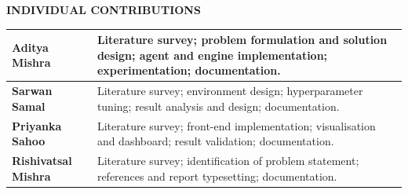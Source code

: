 \begin{center}{\Large\bfseries INDIVIDUAL CONTRIBUTIONS}\end{center}
\vspace{1em}

\begin{table}[H]
\centering
\renewcommand{\arraystretch}{1.4}
\begin{tabular}{|p{4cm}|p{9cm}|}
\hline
\textbf{Aditya Mishra} & Literature survey; problem formulation and solution design; agent and engine implementation; experimentation; documentation.\\
\hline
\textbf{Sarwan Samal} & Literature survey; environment design; hyperparameter tuning; result analysis and design; documentation.\\
\hline
\textbf{Priyanka Sahoo} & Literature survey; front-end implementation; visualisation and dashboard; result validation; documentation.\\
\hline
\textbf{Rishivatsal Mishra} & Literature survey; identification of problem statement; references and report typesetting; documentation.\\
\hline
\end{tabular}
\end{table}
\newpage
